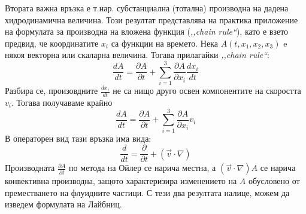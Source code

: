 Втората важна връзка е т.нар. субстанциална (тотална) производна на дадена хидродинамична величина. Този резултат представлява на практика приложение на формулата
за производна на вложена функция (\textit{,,chain rule``}), като е взето предвид, че координатите $x_i$ са функции на времето.
Нека $A(t, x_1,x_2,x_3)$ e някоя векторна или скаларна величина. Тогава прилагайки \textit{,,chain rule``}:
\begin{equation*}
	\frac{d A}{d t}=\frac{\partial A}{\partial t}+\sum _{i=1}^3 \frac{\partial A}{\partial x_i}\frac{d x_i}{d t}
\end{equation*}
Разбира се, произовдните $\frac{d x_i}{d t}$ не са нищо друго освен компонентите на скоростта $v_i$. Тогава получаваме крайно
\begin{equation}
	\label{eq:total_der}
	\frac{d A}{d t}=\frac{\partial A}{\partial t}+\sum _{i=1}^3 \frac{\partial A}{\partial x_i} v_i
\end{equation}
В операторен вид тази връзка има вида:
\begin{equation}
	\label{eq:total_der_op}
	\frac{d}{d t} = \frac{\partial}{\partial t} + (\vec{v} \cdot \nabla)
\end{equation}
Производната $\frac{\partial A}{\partial t}$ по метода на Ойлер се нарича местна, а $(\vec{v} \cdot \nabla)A$ се нарича конвективна производна, защото характеризира изменението на $A$ обусловено
от преместването на флуидните частици. С тези два резултата налице, можем да изведем формулата на Лайбниц.

